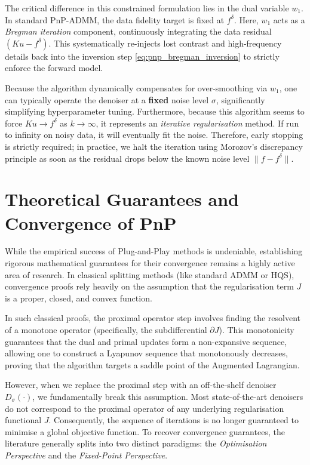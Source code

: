 The critical difference in this constrained formulation lies in the dual variable $w_1$. In standard PnP-ADMM, the data fidelity target is fixed at $f^\delta$. Here, $w_1$ acts as a \emph{Bregman iteration} component, continuously integrating the data residual $(Ku - f^\delta)$. This systematically re-injects lost contrast and high-frequency details back into the inversion step \eqref{eq:pnp_bregman_inversion} to strictly enforce the forward model. 

Because the algorithm dynamically compensates for over-smoothing via $w_1$, one can typically operate the denoiser at a \textbf{fixed} noise level $\sigma$, significantly simplifying hyperparameter tuning. Furthermore, because this algorithm seems to force $Ku \to f^\delta$ as $k \to \infty$, it represents an \emph{iterative regularisation} method. If run to infinity on noisy data, it will eventually fit the noise.  Therefore, early stopping is strictly required; in practice, we halt the iteration using Morozov's discrepancy principle \cite{morozov1966solution} as soon as the residual drops below the known noise level $\| f - f^\delta \|$.

\section{Theoretical Guarantees and Convergence of PnP}
\label{sec:pnp_convergence}

While the empirical success of Plug-and-Play methods is undeniable, establishing rigorous mathematical guarantees for their convergence remains a highly active area of research. In classical splitting methods (like standard ADMM or HQS), convergence proofs rely heavily on the assumption that the regularisation term $J$ is a proper, closed, and convex function. 

In such classical proofs, the proximal operator step involves finding the resolvent of a monotone operator (specifically, the subdifferential $\partial J$). This monotonicity guarantees that the dual and primal updates form a non-expansive sequence, allowing one to construct a Lyapunov sequence that monotonously decreases, proving that the algorithm targets a saddle point of the Augmented Lagrangian.

However, when we replace the proximal step with an off-the-shelf denoiser $D_\sigma(\cdot)$, we fundamentally break this assumption. Most state-of-the-art denoisers do not correspond to the proximal operator of any underlying regularisation functional $J$. Consequently, the sequence of iterations is no longer guaranteed to minimise a global objective function. To recover convergence guarantees, the literature generally splits into two distinct paradigms: the \emph{Optimisation Perspective} and the \emph{Fixed-Point Perspective}.

